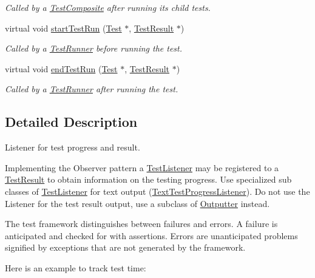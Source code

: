 \begin{DoxyCompactItemize}
\begin{DoxyCompactList}\small\item\em Called by a \hyperlink{class_test_composite}{Test\-Composite} after running its child tests. \end{DoxyCompactList}\item 
virtual void \hyperlink{class_test_listener_a263428abdf29b2a7123af4096771925e}{start\-Test\-Run} (\hyperlink{class_test}{Test} $\ast$, \hyperlink{class_test_result}{Test\-Result} $\ast$)
\begin{DoxyCompactList}\small\item\em Called by a \hyperlink{class_test_runner}{Test\-Runner} before running the test. \end{DoxyCompactList}\item 
virtual void \hyperlink{class_test_listener_a0411708032f688f6ec234bcc5e089289}{end\-Test\-Run} (\hyperlink{class_test}{Test} $\ast$, \hyperlink{class_test_result}{Test\-Result} $\ast$)
\begin{DoxyCompactList}\small\item\em Called by a \hyperlink{class_test_runner}{Test\-Runner} after running the test. \end{DoxyCompactList}\end{DoxyCompactItemize}


\subsection{Detailed Description}
Listener for test progress and result.

Implementing the Observer pattern a \hyperlink{class_test_listener}{Test\-Listener} may be registered to a \hyperlink{class_test_result}{Test\-Result} to obtain information on the testing progress. Use specialized sub classes of \hyperlink{class_test_listener}{Test\-Listener} for text output (\hyperlink{class_text_test_progress_listener}{Text\-Test\-Progress\-Listener}). Do not use the Listener for the test result output, use a subclass of \hyperlink{class_outputter}{Outputter} instead. 

The test framework distinguishes between failures and errors. A failure is anticipated and checked for with assertions. Errors are unanticipated problems signified by exceptions that are not generated by the framework.

Here is an example to track test time\-:


